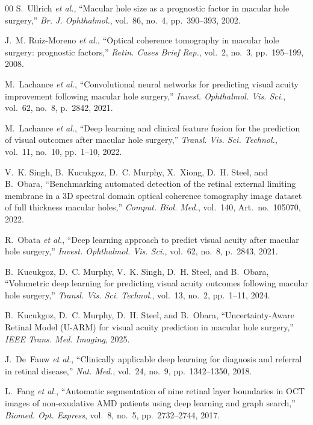 \documentclass[preprint,12pt]{elsarticle}
\begin{document}
\begin{thebibliography}{00}
S.~Ullrich \textit{et al.}, ``Macular hole size as a prognostic factor in macular hole surgery,'' \textit{Br. J. Ophthalmol.}, vol.~86, no.~4, pp.~390--393, 2002.

J.~M. Ruiz-Moreno \textit{et al.}, ``Optical coherence tomography in macular hole surgery: prognostic factors,'' \textit{Retin. Cases Brief Rep.}, vol.~2, no.~3, pp.~195--199, 2008.

M.~Lachance \textit{et al.}, ``Convolutional neural networks for predicting visual acuity improvement following macular hole surgery,'' \textit{Invest. Ophthalmol. Vis. Sci.}, vol.~62, no.~8, p.~2842, 2021.

M.~Lachance \textit{et al.}, ``Deep learning and clinical feature fusion for the prediction of visual outcomes after macular hole surgery,'' \textit{Transl. Vis. Sci. Technol.}, vol.~11, no.~10, pp.~1--10, 2022.

V.~K. Singh, B.~Kucukgoz, D.~C. Murphy, X.~Xiong, D.~H. Steel, and B.~Obara, ``Benchmarking automated detection of the retinal external limiting membrane in a 3D spectral domain optical coherence tomography image dataset of full thickness macular holes,'' \textit{Comput. Biol. Med.}, vol.~140, Art.~no.~105070, 2022.

R.~Obata \textit{et al.}, ``Deep learning approach to predict visual acuity after macular hole surgery,'' \textit{Invest. Ophthalmol. Vis. Sci.}, vol.~62, no.~8, p.~2843, 2021.

B.~Kucukgoz, D.~C. Murphy, V.~K. Singh, D.~H. Steel, and B.~Obara, ``Volumetric deep learning for predicting visual acuity outcomes following macular hole surgery,'' \textit{Transl. Vis. Sci. Technol.}, vol.~13, no.~2, pp.~1--11, 2024.

B.~Kucukgoz, D.~C. Murphy, D.~H. Steel, and B.~Obara, ``Uncertainty-Aware Retinal Model (U-ARM) for visual acuity prediction in macular hole surgery,'' \textit{IEEE Trans. Med. Imaging}, 2025.

J.~De~Fauw \textit{et al.}, ``Clinically applicable deep learning for diagnosis and referral in retinal disease,'' \textit{Nat. Med.}, vol.~24, no.~9, pp.~1342--1350, 2018.

L.~Fang \textit{et al.}, ``Automatic segmentation of nine retinal layer boundaries in OCT images of non-exudative AMD patients using deep learning and graph search,'' \textit{Biomed. Opt. Express}, vol.~8, no.~5, pp.~2732--2744, 2017.


\end{thebibliography}
\end{document}
